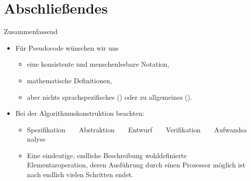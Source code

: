\section{Abschließendes}
{\SummaryFrame
\begin{frame}[t]{Zusammenfassend}
\pause \printBibCommand
\vfill\vfill %
\begin{itemize}[<+(1)->]
    \itemsep16pt
    \item Für Pseudocode wünschen wir uns \begin{itemize}
        \item eine konsistente und menschenlesbare Notation,
        \item mathematische Definitionen,
        \item aber nichts sprachspezifisches () oder zu allgemeines ().
    \end{itemize}
    \item Bei der Algorithmuskonstruktion beachten: \begin{itemize}
        \item \def\t{~~\faAngleRight~~}Spezifikation\t Abstraktion\t Entwurf\t Verifikation\t Aufwandsanalyse
        \item Eine eindeutige, endliche Beschreibung wohldefinierte Elementaroperation, deren Ausführung durch einen Prozessor möglich ist nach endlich vielen Schritten endet.
    \end{itemize}
\end{itemize}
\end{frame}
}


\iffull\fi

